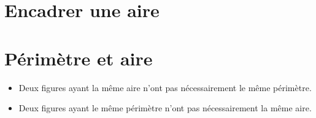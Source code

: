 \begin{pageCours}
\section{Encadrer une aire}



\section{Périmètre et aire}

\begin{Rqs}
\begin{itemize}
\item Deux figures ayant la même aire n'ont pas nécessairement le même périmètre.
\item Deux figures ayant le même périmètre n'ont pas nécessairement la même aire.
\end{itemize}
\end{Rqs}


\end{pageCours}
